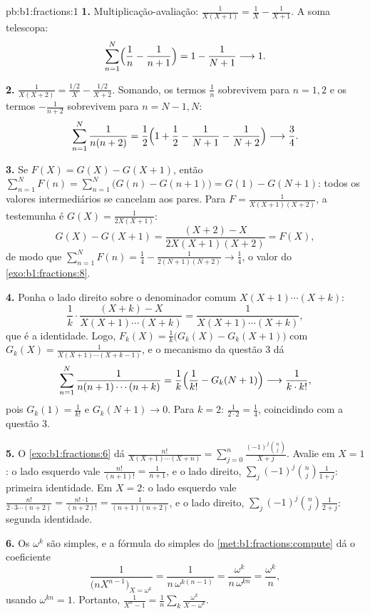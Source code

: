 \begin{solution}{pb:b1:fractions:1}
\textbf{1.} Multiplicação-avaliação: $\frac1{X(X+1)} = \frac1X - \frac1{X+1}$.
A soma telescopa:
\[
\sum_{n=1}^{N}\Bigl(\frac1n - \frac1{n+1}\Bigr)
= 1 - \frac1{N+1} \longrightarrow 1 .
\]

\textbf{2.} $\frac1{X(X+2)} = \frac{1/2}X - \frac{1/2}{X+2}$.
Somando, os termos $\frac1n$ sobrevivem para $n = 1, 2$ e os termos
$-\frac1{n+2}$ sobrevivem para $n = N-1, N$:
\[
\sum_{n=1}^{N}\frac1{n(n+2)}
= \frac12\Bigl(1 + \frac12 - \frac1{N+1} - \frac1{N+2}\Bigr)
\longrightarrow \frac34 .
\]

\textbf{3.} Se $F(X) = G(X) - G(X+1)$, então $\sum_{n=1}^N F(n) =
\sum_{n=1}^N\bigl(G(n) - G(n+1)\bigr) = G(1) - G(N+1)$: todos os
valores intermediários se cancelam aos pares. Para $F =
\frac1{X(X+1)(X+2)}$, a testemunha é $G(X) = \frac1{2X(X+1)}$:
\[
G(X) - G(X+1)
= \frac{(X+2) - X}{2X(X+1)(X+2)} = F(X) ,
\]
de modo que $\sum_{n=1}^N F(n) = \frac14 - \frac1{2(N+1)(N+2)} \to
\frac14$, o valor do \cref{exo:b1:fractions:8}.

\textbf{4.} Ponha o lado direito sobre o denominador comum
$X(X+1)\cdots(X+k)$:
\[
\frac1k\cdot\frac{(X + k) - X}{X(X+1)\cdots(X+k)}
= \frac{1}{X(X+1)\cdots(X+k)} ,
\]
que é a identidade. Logo, $F_k(X) = \frac1k\bigl(G_k(X) -
G_k(X+1)\bigr)$ com $G_k(X) = \frac1{X(X+1)\cdots(X+k-1)}$, e
o mecanismo da questão 3 dá
\[
\sum_{n=1}^{N}\frac1{n(n+1)\cdots(n+k)}
= \frac1k\Bigl(\frac1{k!} - G_k(N+1)\Bigr)
\longrightarrow \frac1{k\cdot k!} ,
\]
pois $G_k(1) = \frac1{k!}$ e $G_k(N+1) \to 0$. Para $k = 2$:
$\frac1{2\cdot2} = \frac14$, coincidindo com a questão 3.

\textbf{5.} O \cref{exo:b1:fractions:6} dá
$\frac{n!}{X(X+1)\cdots(X+n)} = \sum_{j=0}^n
\frac{(-1)^j\binom nj}{X + j}$. Avalie em $X = 1$: o lado esquerdo
vale $\frac{n!}{(n+1)!} = \frac1{n+1}$, e o lado direito,
$\sum_j(-1)^j\binom nj\frac1{1+j}$: primeira identidade. Em $X = 2$:
o lado esquerdo vale $\frac{n!}{2\cdot3\cdots(n+2)} =
\frac{n!\cdot1}{(n+2)!} = \frac1{(n+1)(n+2)}$, e o lado direito,
$\sum_j(-1)^j\binom nj\frac1{2+j}$: segunda identidade.

\textbf{6.} Os  $\omega^k$ são simples, e a fórmula do 
simples do \cref{met:b1:fractions:compute} dá o coeficiente
\[
\frac{1}{\bigl(nX^{n-1}\bigr)_{X = \omega^k}}
= \frac{1}{n\,\omega^{k(n-1)}}
= \frac{\omega^k}{n\,\omega^{kn}} = \frac{\omega^k}n ,
\]
usando $\omega^{kn} = 1$. Portanto, $\frac1{X^n-1} = \frac1n\sum_k
\frac{\omega^k}{X - \omega^k}$.


\end{solution}
